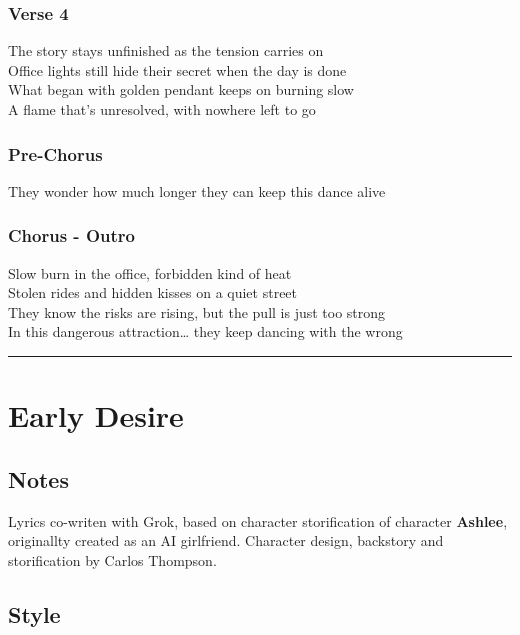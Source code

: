 \subsubsection{Verse 4}\label{verse-4-12}

The story stays unfinished as the tension carries on\\
Office lights still hide their secret when the day is done\\
What began with golden pendant keeps on burning slow\\
A flame that's unresolved, with nowhere left to go

\subsubsection{Pre-Chorus}\label{pre-chorus-66}

They wonder how much longer they can keep this dance alive

\subsubsection{Chorus - Outro}\label{chorus---outro-8}

Slow burn in the office, forbidden kind of heat\\
Stolen rides and hidden kisses on a quiet street\\
They know the risks are rising, but the pull is just too strong\\
In this dangerous attraction\ldots{} they keep dancing with the wrong

\begin{center}\rule{0.5\linewidth}{0.5pt}\end{center}

\section{Early Desire}\label{early-desire}

\subsection{Notes}\label{notes-42}

Lyrics co-writen with Grok, based on character storification of
character \textbf{Ashlee}, originallty created as an AI girlfriend.
Character design, backstory and storification by Carlos Thompson.

\subsection{Style}\label{style-41}

